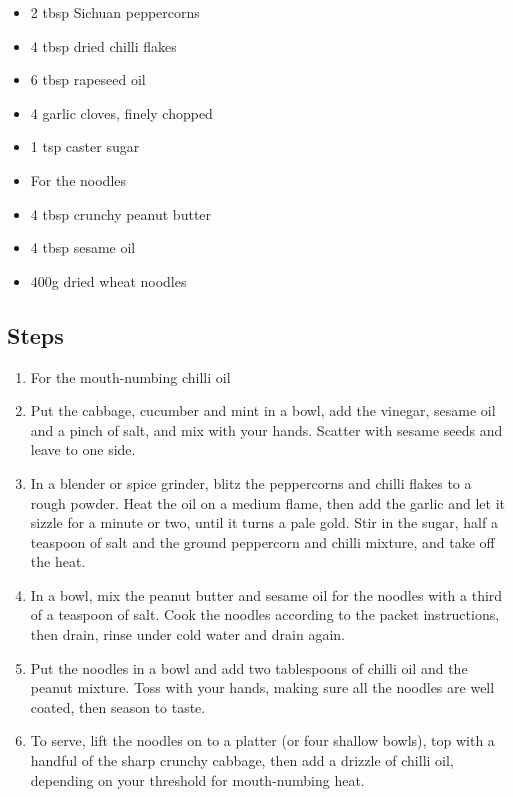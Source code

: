 \documentclass{book}
\begin{document}
\begin{itemize}
\item 2 tbsp Sichuan peppercorns
\item 4 tbsp dried chilli flakes
\item 6 tbsp rapeseed oil
\item 4 garlic cloves, finely chopped
\item 1 tsp caster sugar
\end{itemize}

\begin{itemize}
\item For the noodles
\item 4 tbsp crunchy peanut butter
\item 4 tbsp sesame oil
\item 400g dried wheat noodles 
\end{itemize}

\subsection*{Steps}
\begin{enumerate}
\item For the mouth-numbing chilli oil
\item Put the cabbage, cucumber and mint in a bowl, add the vinegar, sesame oil and a pinch of salt, and mix with your hands. Scatter with sesame seeds and leave to one side.
\item In a blender or spice grinder, blitz the peppercorns and chilli flakes to a rough powder. Heat the oil on a medium flame, then add the garlic and let it sizzle for a minute or two, until it turns a pale gold. Stir in the sugar, half a teaspoon of salt and the ground peppercorn and chilli mixture, and take off the heat.
\item In a bowl, mix the peanut butter and sesame oil for the noodles with a third of a teaspoon of salt. Cook the noodles according to the packet instructions, then drain, rinse under cold water and drain again.
\item Put the noodles in a bowl and add two tablespoons of chilli oil and the peanut mixture. Toss with your hands, making sure all the noodles are well coated, then season to taste.
\item To serve, lift the noodles on to a platter (or four shallow bowls), top with a handful of the sharp crunchy cabbage, then add a drizzle of chilli oil, depending on your threshold for mouth-numbing heat.
\end{enumerate}
\newpage
\end{document}
